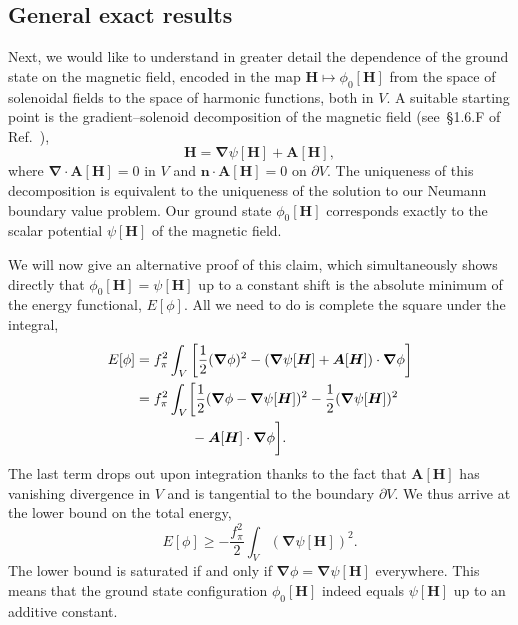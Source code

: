 \documentclass[pdflatex,iicol,sn-mathphys-num]{sn-jnl}
\let\p=\phi
\let\de=\partial
\newcommand{\vek}[1]{\bm{#1}}%
\newcommand{\grad}{\vek\nabla}%
\newcommand{\divg}{\grad\cdot}%
\begin{document}

\subsection{General exact results}
\label{subsec:nonuniformBzeroMgeneral}

Next, we would like to understand in greater detail the dependence of the ground state on the magnetic field, encoded in the map $\vek H\mapsto\p_0[\vek H]$ from the space of solenoidal fields to the space of harmonic functions, both in $V$. A suitable starting point is the gradient--solenoid decomposition of the magnetic field (see~\S 1.6.F of Ref.~\cite{Gallavotti2002}),
\begin{equation}
\vek H=\grad\psi[\vek H]+\vek A[\vek H],
\label{eq:helmholtz}
\end{equation}
where $\divg\vek A[\vek H]=0$ in $V$ and $\vek n\cdot\vek A[\vek H]=0$ on $\de V$. The uniqueness of this decomposition is equivalent to the uniqueness of the solution to our Neumann boundary value problem. Our ground state $\p_0[\vek H]$ corresponds exactly to the scalar potential $\psi[\vek H]$ of the magnetic field.

We will now give an alternative proof of this claim, which simultaneously shows directly that $\p_0[\vek H]=\psi[\vek H]$ up to a constant shift is the absolute minimum of the energy functional, $E[\p]$. All we need to do is complete the square under the integral,
\begin{align}
\notag
E[\p]&=f_\pi^2\int_V\left[\frac12(\grad\p)^2-(\grad\psi[\vek H]+\vek A[\vek H])\cdot\grad\p\right]\\
\notag
&=f_\pi^2\int_V\biggl[\frac12(\grad\p-\grad\psi[\vek H])^2-\frac12(\grad\psi[\vek H])^2\\
&\qquad\qquad-\vek A[\vek H]\cdot\grad\p\biggr].
\end{align}
The last term drops out upon integration thanks to the fact that $\vek A[\vek H]$ has vanishing divergence in $V$ and is tangential to the boundary $\de V$. We thus arrive at the lower bound on the total energy,
\begin{equation}
E[\p]\geq-\frac{f_\pi^2}2\int_V(\grad\psi[\vek H])^2.
\label{eq:energybound1}
\end{equation}
The lower bound is saturated if and only if $\grad\p=\grad\psi[\vek H]$ everywhere. This means that the ground state configuration $\p_0[\vek H]$ indeed equals $\psi[\vek H]$ up to an additive constant.
\end{document}
